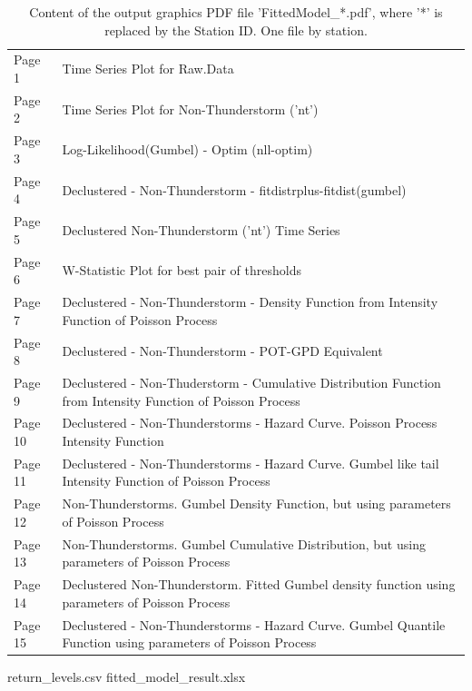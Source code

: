 \documentclass[12pt,oneside]{reedthesis}
\begin{document}
\begingroup\fontsize{8}{10}\selectfont
\begin{longtable}[t]{>{\raggedright\arraybackslash}p{0.4in}>{\raggedright\arraybackslash}p{5.7in}}
\caption[fittedmodelidpdf]{\label{tab:fittedmodelidpdf}Content of the output graphics PDF file 'FittedModel\_*.pdf', where '*' is replaced by the Station ID. One file by station.}\\
\toprule
\multicolumn{1}{l}{Graphic} & \multicolumn{1}{l}{Description}\\
\midrule
Page 1 & Time Series Plot for Raw.Data\\
Page 2 & Time Series Plot for Non-Thunderstorm ('nt')\\
Page 3 & Log-Likelihood(Gumbel) - Optim (nll-optim)\\
Page 4 & Declustered - Non-Thunderstorm - fitdistrplus-fitdist(gumbel)\\
Page 5 & Declustered Non-Thunderstorm ('nt') Time Series\\
Page 6 & W-Statistic Plot for best pair of thresholds\\
Page 7 & Declustered - Non-Thunderstorm - Density Function from Intensity Function of Poisson Process\\
Page 8 & Declustered - Non-Thunderstorm - POT-GPD Equivalent\\
Page 9 & Declustered - Non-Thuderstorm - Cumulative Distribution Function from Intensity Function of Poisson Process\\
Page 10 & Declustered - Non-Thunderstorms - Hazard Curve. Poisson Process Intensity Function\\
Page 11 & Declustered - Non-Thunderstorms - Hazard Curve. Gumbel like tail Intensity Function of Poisson Process\\
Page 12 & Non-Thunderstorms. Gumbel Density Function, but using parameters of Poisson Process\\
Page 13 & Non-Thunderstorms. Gumbel Cumulative Distribution, but using parameters of Poisson Process\\
Page 14 & Declustered Non-Thunderstorm. Fitted Gumbel density function using parameters of Poisson Process\\
Page 15 & Declustered - Non-Thunderstorms - Hazard Curve. Gumbel Quantile Function using parameters of Poisson Process\\
\bottomrule
\end{longtable}
\endgroup{}

return\_levels.csv
fitted\_model\_result.xlsx
\end{document}
